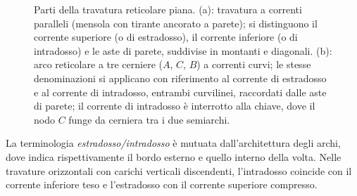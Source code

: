 \begin{figure}[htbp]
{}
	\caption{Parti della travatura reticolare piana.
		(a): travatura a correnti paralleli
		(mensola con tirante ancorato a parete); si
		distinguono il corrente superiore (o di
		estradosso), il corrente inferiore (o di
		intradosso) e le aste di parete, suddivise
		in montanti e diagonali.
		(b): arco reticolare a tre cerniere
		($A$, $C$, $B$) a correnti curvi; le stesse
		denominazioni si applicano con riferimento al
		corrente di estradosso e al corrente di
		intradosso, entrambi curvilinei, raccordati
		dalle aste di parete; il corrente di intradosso
		è interrotto alla chiave, dove il nodo $C$
		funge da cerniera tra i due semiarchi.}
	\label{fig:parti_travatura}
\end{figure}



\begin{oss}
	La terminologia \emph{estradosso/intradosso}
	è mutuata dall'architettura degli archi, dove
	indica rispettivamente il bordo esterno e
	quello interno della volta. Nelle travature
	orizzontali con carichi verticali discendenti,
	l'intradosso coincide con il corrente inferiore
	teso e l'estradosso con il corrente superiore
	compresso.
\end{oss}


